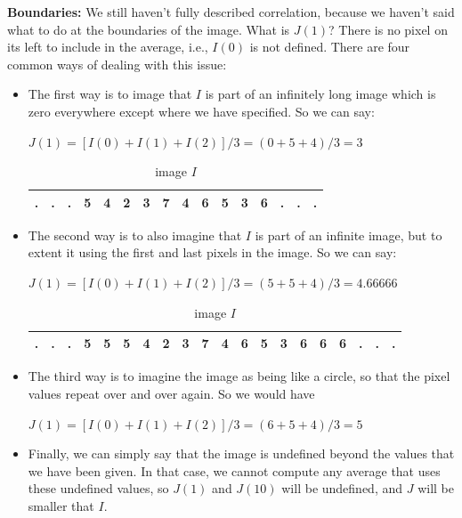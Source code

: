 \documentclass{report}
\begin{document}
\textbf{Boundaries:} We still haven't fully described correlation, because we haven't said what to do at the boundaries of the image. What is $J(1)$? There is no pixel on its left to include in the average, i.e., $I(0)$ is not defined. There are four common ways of dealing with this issue:
\begin{itemize}
    \item The first way is to image that $I$ is part of an infinitely long image which is zero everywhere except where we have specified. So we can say:\newline\newline
        \centerline{$J(1)=[I(0)+I(1)+I(2)]/3=(0+5+4)/3=3$}\newline
        \begin{table}[h]
        \centering
        \label{my-label-1}
        \begin{tabular}{|l|l|l|l|l|l|l|l|l|l|l|l|l|l|l|l|}
        \hline
        . & . & .& 5 & 4 & 2 & 3 & 7 & 4 & 6 & 5 & 3 & 6 & . & . & .\\ \hline
        \end{tabular}
        \caption{image $I$}
        \end{table}
        
    \item The second way is to also imagine that $I$ is part of an infinite image, but to extent it using the first and last pixels in the image. So we can say: \newline\newline
          \centerline{$J(1)=[I(0)+I(1)+I(2)]/3=(5+5+4)/3=4.66666$}\newline\newline    
        \begin{table}[h]
        \centering
        \label{my-label-2}
        \begin{tabular}{|l|l|l|l|l|l|l|l|l|l|l|l|l|l|l|l|l|l|l|l|}
        \hline
        . &. & . & 5 & 5 & 5 & 4 & 2 & 3 & 7 & 4 & 6 & 5 & 3 & 6 & 6 & 6 & . & . & .\\ \hline
        \end{tabular}
        \caption{image $I$}
        \end{table}
        
    \item The third way is to imagine the image as being like a circle, so that the pixel values repeat over and over again. So we would have\newline\newline
        \centerline{$J(1)=[I(0)+I(1)+I(2)]/3=(6+5+4)/3=5$}
    \item Finally, we can simply say that the image is undefined beyond the values that we have been given. In that case, we cannot compute any average that uses these undefined values, so $J(1)$ and $J(10)$ will be undefined, and $J$ will be smaller that $I$.
\end{itemize}
\end{document}
